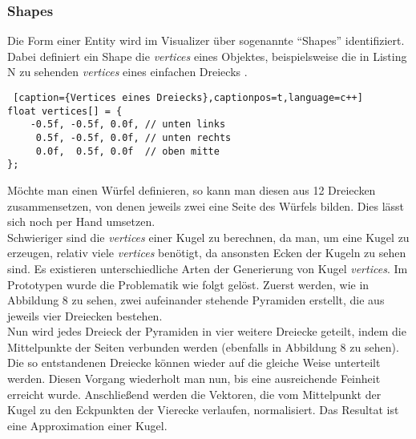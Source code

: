 \documentclass[11pt,a4paper]{article}
\begin{document}
\subsubsection*{Shapes}
Die Form einer Entity wird im Visualizer über sogenannte ``Shapes'' identifiziert. Dabei definiert ein Shape die \mbox{\textit{vertices}} eines Objektes, beispielsweise die in Listing N zu sehenden \mbox{\textit{vertices}} eines einfachen Dreiecks \cite[Kap. ``Hello Tiangle'']{LearnOpenGL}.

\begin{lstlisting} [caption={Vertices eines Dreiecks},captionpos=t,language=c++]
float vertices[] = {
    -0.5f, -0.5f, 0.0f, // unten links
     0.5f, -0.5f, 0.0f, // unten rechts
     0.0f,  0.5f, 0.0f  // oben mitte
};
\end{lstlisting}
\noindent
Möchte man einen Würfel definieren, so kann man diesen aus 12 Dreiecken zusammensetzen, von denen jeweils zwei eine Seite des Würfels bilden. Dies lässt sich noch per Hand umsetzen.\\
Schwieriger sind die  \mbox{\textit{vertices}} einer Kugel zu berechnen, da man, um eine Kugel zu erzeugen, relativ viele  \mbox{\textit{vertices}} benötigt, da ansonsten Ecken der Kugeln zu sehen sind. Es existieren unterschiedliche Arten der Generierung von Kugel  \mbox{\textit{vertices}}. Im Prototypen wurde die Problematik wie folgt gelöst. Zuerst werden, wie in Abbildung 8 zu sehen, zwei aufeinander stehende Pyramiden erstellt, die aus jeweils vier Dreiecken bestehen.\\
Nun wird jedes Dreieck der Pyramiden in vier weitere Dreiecke geteilt, indem die Mittelpunkte der Seiten verbunden werden (ebenfalls in Abbildung 8 zu sehen). Die so entstandenen Dreiecke können wieder auf die gleiche Weise unterteilt werden. Diesen Vorgang wiederholt man nun, bis eine ausreichende Feinheit erreicht wurde. Anschließend werden die Vektoren, die vom Mittelpunkt der Kugel zu den Eckpunkten der Vierecke verlaufen, normalisiert. Das Resultat ist eine Approximation einer Kugel.\\
\end{document}
